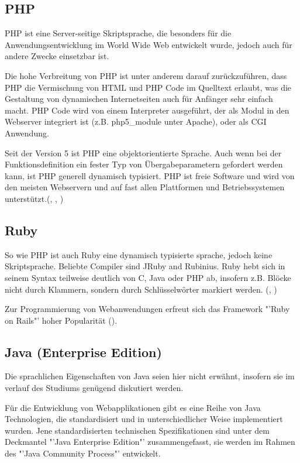 \documentclass[12pt]{report}
\begin{document}
\subsection{PHP}
PHP ist eine Server-seitige Skriptsprache, die besonders für die Anwendungsentwicklung im World Wide Web entwickelt wurde, jedoch auch für andere Zwecke einsetzbar ist.

Die hohe Verbreitung von PHP ist unter anderem darauf zurückzuführen, dass PHP die Vermischung von HTML und PHP Code im Quelltext erlaubt, was die Gestaltung von dynamischen Internetseiten auch für Anfänger sehr einfach macht. PHP Code wird von einem Interpreter ausgeführt, der als Modul in den Webserver integriert ist (z.B. php5\_module unter Apache), oder als CGI Anwendung.

Seit der Version 5 ist PHP eine objektorientierte Sprache. Auch wenn bei der Funktionsdefinition ein fester Typ von Übergabeparametern gefordert werden kann, ist PHP generell dynamisch typisiert. PHP ist freie Software und wird von den meisten Webservern und auf fast allen Plattformen und Betriebssystemen unterstützt.(\cite{ebooks:PHP}, \cite{ebooks:PHP2}, \cite{PHPManual})

\subsection{Ruby}
So wie PHP ist auch Ruby eine dynamisch typisierte sprache, jedoch keine Skriptsprache. Beliebte Compiler sind JRuby and Rubinius. Ruby hebt sich in seinem Syntax teilweise deutlich von C, Java oder PHP ab, insofern z.B. Blöcke nicht durch Klammern, sondern durch Schlüsselwörter markiert werden. (\cite{Ruby}, \cite{wiki:Ruby})

Zur Programmierung von Webanwendungen erfreut sich das Framework "'Ruby on Rails"' hoher Popularität (\cite{RubyOnRails}).

\subsection{Java (Enterprise Edition)}
Die sprachlichen Eigenschaften von Java seien hier nicht erwähnt, insofern sie im verlauf des Studiums genügend diskutiert werden.

Für die Entwicklung von Webapplikationen gibt es eine Reihe von Java Technologien, die standardisiert und in unterschiedlicher Weise implementiert wurden. Jene standardisierten technischen Spezifikationen sind unter dem Deckmantel "'Java Enterprise Edition"' \cite{JavaEE} zusammengefasst, sie werden im Rahmen des "'Java Community Process"' \cite{JavaCommunityProcess} entwickelt.
\end{document}
